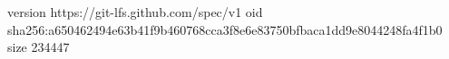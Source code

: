version https://git-lfs.github.com/spec/v1
oid sha256:a650462494e63b41f9b460768cca3f8e6e83750bfbaca1dd9e8044248fa4f1b0
size 234447
